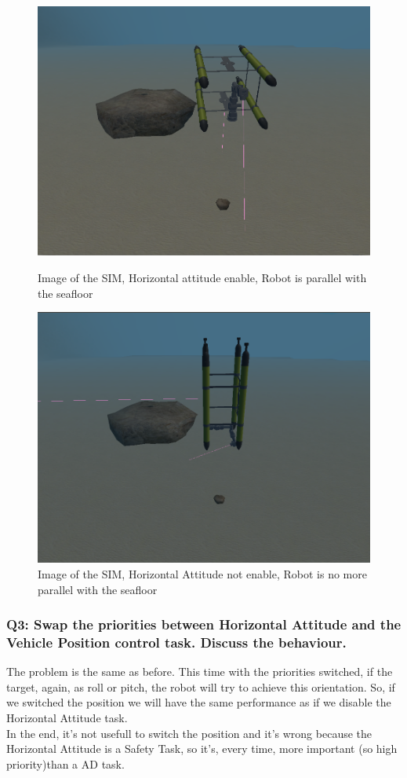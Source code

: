 \documentclass{article}
\begin{document}
\begin{figure}[htp]
\centering
\includegraphics[width=.6\textwidth]{112_HAenabled.png}\caption{Image of the SIM, Horizontal attitude enable, Robot is parallel with the seafloor}
\label{fig:hae}
\centering
\includegraphics[width=.6\textwidth]{112_HANotenabled.png}\caption{Image of the SIM, Horizontal Attitude not enable, Robot is no more parallel with the seafloor}
\label{fig:hane}
\end{figure}

\subsubsection{Q3: Swap the priorities between Horizontal Attitude and the Vehicle Position control task. Discuss the behaviour.}
The problem is the same as before. This time with the priorities switched, if the target, again, as roll or pitch, the robot will try to achieve this orientation. 
So, if we switched the position we will have the same performance as if we disable the Horizontal Attitude task.\\
In the end, it's not usefull to switch the position and it's wrong because the Horizontal Attitude is a Safety Task, so it's, every time, more important (so high priority)than a AD task. 
\end{document}
